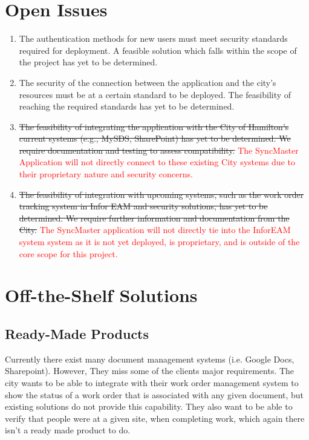 \documentclass[12pt]{article}
\begin{document}
\section{Open Issues}
\begin{enumerate}
  \item The authentication methods for new users must meet security
    standards required for deployment. A feasible solution which
    falls within the scope of the project has yet to be determined.
  \item The security of the connection between the application and
    the city's resources must be at a certain standard to be
    deployed. The feasibility of reaching the required standards has
    yet to be determined.
  \item \sout{The feasibility of integrating the application with the City
    of Hamilton's current systems (e.g., MySDS, SharePoint) has yet
    to be determined. We require documentation and testing to assess
    compatibility.} \textcolor{red}{The SyncMaster Application will not directly connect to these existing
    City systems due to their proprietary nature and security concerns.}
  \item \sout{The feasibility of integration with upcoming systems, such as
    the work order tracking system in Infor EAM and security
    solutions, has yet to be determined. We require further
    information and documentation from the City.} \textcolor{red}{The SyncMaster application will not directly tie into the InforEAM system
    system as it is not yet deployed, is proprietary, and is outside of the core scope for this project.}
\end{enumerate}

\section{Off-the-Shelf Solutions}
\subsection{Ready-Made Products}
Currently there exist many document management systems (i.e. Google Docs,
Sharepoint). However, They miss some of the clients major requirements. The
city wants to be able to integrate with their work order management system to
show the status of a work order that is associated with any given document,
but existing solutions do not provide this capability. They also want to be
able to verify that people were at a given site, when completing work, which
again there isn't a ready made product to do.
\end{document}
